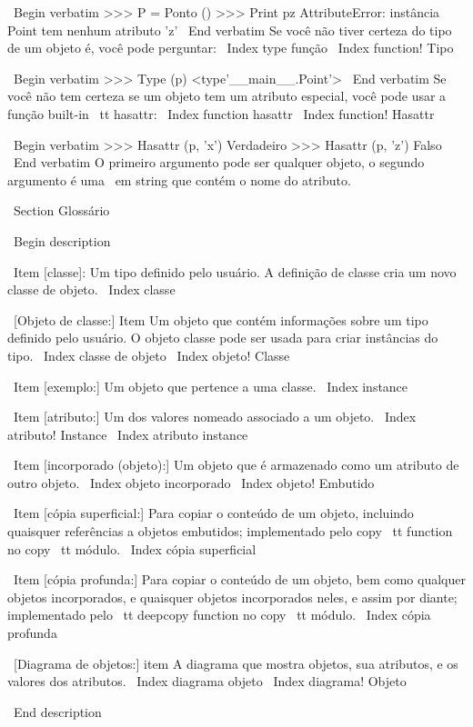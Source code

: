 \documentclass[10pt]{book}
\begin{document}
{{{{{{{{{{{{{\ Begin {verbatim}
>>> P = Ponto ()
>>> Print pz
AttributeError: instância Point tem nenhum atributo 'z'
\ End {verbatim}
%
Se você não tiver certeza do tipo de um objeto é, você pode perguntar:
\ Index {type função}
\ Index {function! Tipo}

\ Begin {verbatim}
>>> Type (p)
<type'__main__.Point'>
\ End {verbatim}
%
Se você não tem certeza se um objeto tem um atributo especial,
você pode usar a função built-in {\ tt hasattr}:
\ Index {function hasattr}
\ Index {function! Hasattr}

\ Begin {verbatim}
>>> Hasattr (p, 'x')
Verdadeiro
>>> Hasattr (p, 'z')
Falso
\ End {verbatim}
%
O primeiro argumento pode ser qualquer objeto, o segundo argumento é uma {\ em
string} que contém o nome do atributo.


\ Section {} Glossário

\ Begin {description}

\ Item [classe]: Um tipo definido pelo usuário. A definição de classe cria um novo
classe de objeto.
\ Index {classe}

\ [Objeto de classe:] Item Um objeto que contém informações sobre um
tipo definido pelo usuário. O objeto classe pode ser usada para criar instâncias
do tipo.
\ Index {classe de objeto}
\ Index {objeto! Classe}

\ Item [exemplo:] Um objeto que pertence a uma classe.
\ Index {instance}

\ Item [atributo:] Um dos valores nomeado associado a um objeto.
\ Index {atributo! Instance}
\ Index {atributo instance}

\ Item [incorporado (objeto):] Um objeto que é armazenado como um atributo
de outro objeto.
\ Index {objeto incorporado}
\ Index {objeto! Embutido}

\ Item [cópia superficial:] Para copiar o conteúdo de um objeto, incluindo
quaisquer referências a objetos embutidos;
implementado pelo {copy \ tt} function no {copy \ tt} módulo.
\ Index {cópia superficial}

\ Item [cópia profunda:] Para copiar o conteúdo de um objeto, bem como qualquer
objetos incorporados, e quaisquer objetos incorporados neles, e assim por diante;
implementado pelo {\ tt deepcopy} function no {copy \ tt} módulo.
\ Index {cópia profunda}

\ [Diagrama de objetos:] item A diagrama que mostra objetos, sua
atributos, e os valores dos atributos.
\ Index {diagrama objeto}
\ Index {diagrama! Objeto}

\ End {description}


}}}}}}}}}}}}}
\end{document}
